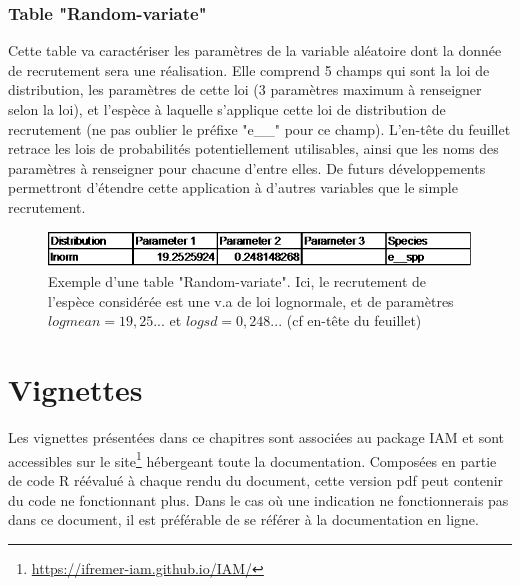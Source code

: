 \documentclass[12pt, colorinlistoftodos, notitlepage]{report}
\newenvironment{not used}[1]{%
    \longtable{%
        |>{\centering$\displaystyle}A{#1}{1}<{$}%
        |}\hline\ignorespaces}{%
    \endlongtable\ignorespacesafterend}
\begin{document}
\subsection{Table "Random-variate"} \label{sec:rand}

Cette table va caractériser les paramètres de la variable aléatoire dont la donnée de recrutement sera une réalisation. Elle comprend 5 champs qui sont la loi de distribution, les paramètres de cette loi (3 paramètres maximum à renseigner selon la loi), et l'espèce à laquelle s'applique cette loi de distribution de recrutement (ne pas oublier le préfixe "e\_\_" pour ce champ). L'en-tête du feuillet retrace les lois de probabilités potentiellement utilisables, ainsi que les noms des paramètres à renseigner pour chacune d'entre elles. De futurs développements permettront d'étendre cette application à d'autres variables que le simple recrutement.

\begin{figure}[H]
    \begin{center}
    \includegraphics[width = 13.42cm]{figures/param/stock15.png}
    \end{center}
    \caption{Exemple d'une table "Random-variate". Ici, le recrutement de l'espèce considérée est une v.a de loi lognormale, et de paramètres $logmean=19,25...$ et $logsd=0,248...$ (cf en-tête du feuillet)}
    \label{fig:random}
\end{figure}

\chapter{Vignettes} \label{vignette}

\minitoc

Les vignettes présentées dans ce chapitres sont associées au package IAM et sont accessibles sur le site\footnote{\url{https://ifremer-iam.github.io/IAM/}} hébergeant toute la documentation. Composées en partie de code R réévalué à chaque rendu du document, cette version pdf peut contenir du code ne fonctionnant plus. Dans le cas où une indication ne fonctionnerais pas dans ce document, il est préférable de se référer à la documentation en ligne.
\end{document}
